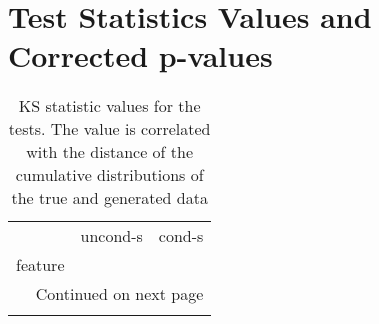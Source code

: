 \appendix
\chapter{Test Statistics Values and Corrected p-values}
\label{sec:app-ks}
\begin{longtable}{lrr}
	\caption[KS statistic values]{ \small KS statistic values for the tests. The value is correlated with the distance of the cumulative distributions of the true and generated data}\\
	\toprule
	{} &  uncond-s &    cond-s \\
	feature                       &           &           \\
	\midrule
	\endhead
	\midrule
	\multicolumn{3}{r}{{Continued on next page}} \\
	\midrule
	\endfoot
	

\end{longtable}
